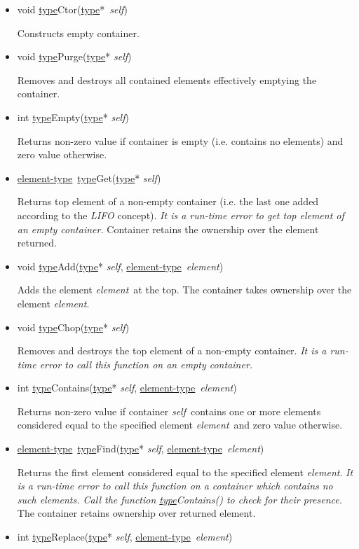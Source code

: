 \documentclass[a4paper]{article}
\newcommand{\st}{\underline{type}}
\newcommand{\et}{\underline{element-type}}
\newcommand{\sv}{\emph{self}}
\newcommand{\ev}{\emph{element}}
\newcommand{\meth}[1]{#1}
\begin{document}
\begin{itemize}


\item \meth{void \st Ctor(\st*\ \sv)}


Constructs empty container.


\commonmethods


\item \meth{void \st Purge}(\st* \sv)


Removes and destroys all contained elements effectively emptying the container.


\item \meth{int \st Empty}(\st* \sv)


Returns non-zero value if container is empty (i.e. contains no elements) and zero value otherwise.


\item \meth{\et\ \st Get(\st* \sv)}


Returns top element of a non-empty container (i.e. the last one added according to the \emph{LIFO} concept).
\emph{It is a run-time error to get top element of an empty container.}
Container retains the ownership over the element returned.


\item \meth{void \st Add(\st* \sv, \et\ \ev)}


Adds the element \ev\ at the top.
The container takes ownership over the element \ev.


\item \meth{void \st Chop(\st* \sv)}


Removes and destroys the top element of a non-empty container.
\emph{It is a run-time error to call this function on an empty container.}


\item \meth{int \st Contains(\st* \sv, \et\ \ev)}


Returns non-zero value if container \sv\ contains one or more elements considered equal to the specified element \ev\ and zero value otherwise.


\item \meth{\et\ \st Find(\st* \sv, \et\ \ev)}


Returns the first element considered equal to the specified element \ev.
\emph{It is a run-time error to call this function on a container which contains no such elements. Call the function \meth{\st Contains()} to check for their presence.}
The container retains ownership over returned element.


\item \meth{int \st Replace(\st* \sv, \et\ \ev)}



\end{itemize}
\end{document}
